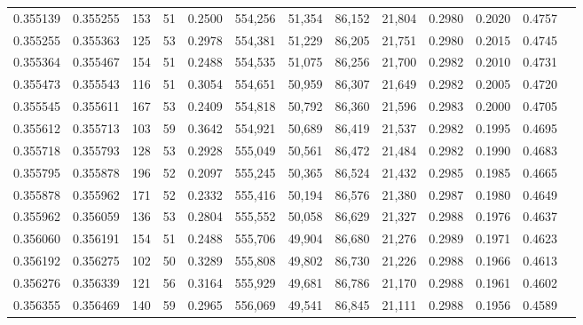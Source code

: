 \begin{tabular}{rrrrrrrrrrrrr}
0.355139 & 0.355255 &   153 &  51 &                                     0.2500 & 554,256 &  51,354 &  86,152 &  21,804 & 0.2980 & 0.2020 & 0.4757 \\
0.355255 & 0.355363 &   125 &  53 &                                     0.2978 & 554,381 &  51,229 &  86,205 &  21,751 & 0.2980 & 0.2015 & 0.4745 \\
0.355364 & 0.355467 &   154 &  51 &                                     0.2488 & 554,535 &  51,075 &  86,256 &  21,700 & 0.2982 & 0.2010 & 0.4731 \\
0.355473 & 0.355543 &   116 &  51 &                                     0.3054 & 554,651 &  50,959 &  86,307 &  21,649 & 0.2982 & 0.2005 & 0.4720 \\
0.355545 & 0.355611 &   167 &  53 &                                     0.2409 & 554,818 &  50,792 &  86,360 &  21,596 & 0.2983 & 0.2000 & 0.4705 \\
0.355612 & 0.355713 &   103 &  59 &                                     0.3642 & 554,921 &  50,689 &  86,419 &  21,537 & 0.2982 & 0.1995 & 0.4695 \\
0.355718 & 0.355793 &   128 &  53 &                                     0.2928 & 555,049 &  50,561 &  86,472 &  21,484 & 0.2982 & 0.1990 & 0.4683 \\
0.355795 & 0.355878 &   196 &  52 &                                     0.2097 & 555,245 &  50,365 &  86,524 &  21,432 & 0.2985 & 0.1985 & 0.4665 \\
0.355878 & 0.355962 &   171 &  52 &                                     0.2332 & 555,416 &  50,194 &  86,576 &  21,380 & 0.2987 & 0.1980 & 0.4649 \\
0.355962 & 0.356059 &   136 &  53 &                                     0.2804 & 555,552 &  50,058 &  86,629 &  21,327 & 0.2988 & 0.1976 & 0.4637 \\
0.356060 & 0.356191 &   154 &  51 &                                     0.2488 & 555,706 &  49,904 &  86,680 &  21,276 & 0.2989 & 0.1971 & 0.4623 \\
0.356192 & 0.356275 &   102 &  50 &                                     0.3289 & 555,808 &  49,802 &  86,730 &  21,226 & 0.2988 & 0.1966 & 0.4613 \\
0.356276 & 0.356339 &   121 &  56 &                                     0.3164 & 555,929 &  49,681 &  86,786 &  21,170 & 0.2988 & 0.1961 & 0.4602 \\
0.356355 & 0.356469 &   140 &  59 &                                     0.2965 & 556,069 &  49,541 &  86,845 &  21,111 & 0.2988 & 0.1956 & 0.4589 \\

\end{tabular}
